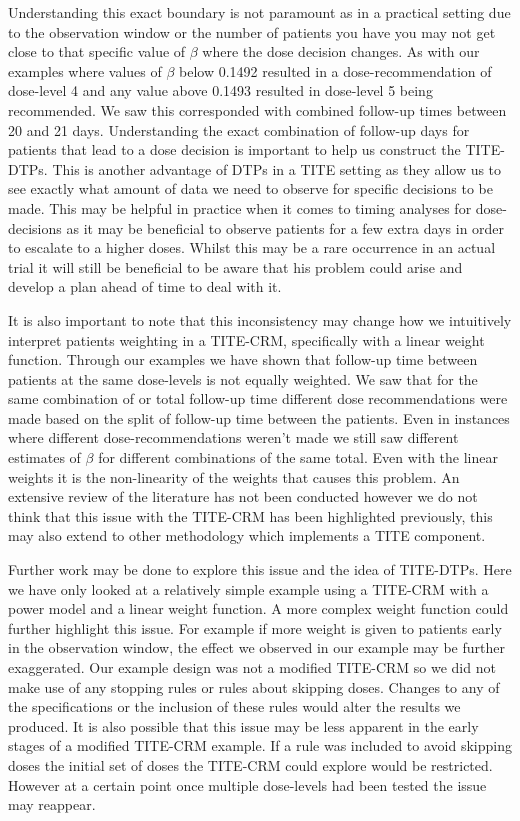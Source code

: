 Understanding this exact boundary is not paramount as in a practical setting due to the observation window or the number of patients you have you may not get close to that specific value of $\beta$ where the dose decision changes. As with our examples where values of $\beta$ below 0.1492 resulted in a dose-recommendation of dose-level 4 and any value above 0.1493 resulted in dose-level 5 being recommended. We saw this corresponded with combined follow-up times between 20 and 21 days. Understanding the exact combination of follow-up days for patients that lead to a dose decision is important to help us construct the TITE-DTPs. This is another advantage of DTPs in a TITE setting as they allow us to see exactly what amount of data we need to observe for specific decisions to be made. This may be helpful in practice when it comes to timing analyses for dose-decisions as it may be beneficial to observe patients for a few extra days in order to escalate to a higher doses. Whilst this may be a rare occurrence in an actual trial it will still be beneficial to be aware that his problem could arise and develop a plan ahead of time to deal with it. 

It is also important to note that this inconsistency may change how we intuitively interpret patients weighting in a TITE-CRM, specifically with a linear weight function. Through our examples we have shown that follow-up time between patients at the same dose-levels is not equally weighted. We saw that for the same combination of or total follow-up time different dose recommendations were made based on the split of follow-up time between the patients. Even in instances where different dose-recommendations weren't made we still saw different estimates of $\beta$ for different combinations of the same total. Even with the linear weights it is the non-linearity of the weights that causes this problem. An extensive review of the literature has not been conducted however we do not think that this issue with the TITE-CRM has been highlighted previously, this may also extend to other methodology which implements a TITE component. 

Further work may be done to explore this issue and the idea of TITE-DTPs. Here we have only looked at a relatively simple example using a TITE-CRM with a power model and a linear weight function. A more complex weight function could further highlight this issue. For example if more weight is given to patients early in the observation window, the effect we observed in our example may be further exaggerated. Our example design was not a modified TITE-CRM so we did not make use of any stopping rules or rules about skipping doses. Changes to any of the specifications or the inclusion of these rules would alter the results we produced. It is also possible that this issue may be less apparent in the early stages of a modified TITE-CRM example. If a rule was included to avoid skipping doses the initial set of doses the TITE-CRM could explore would be restricted. However at a certain point once multiple dose-levels had been tested the issue may reappear.

